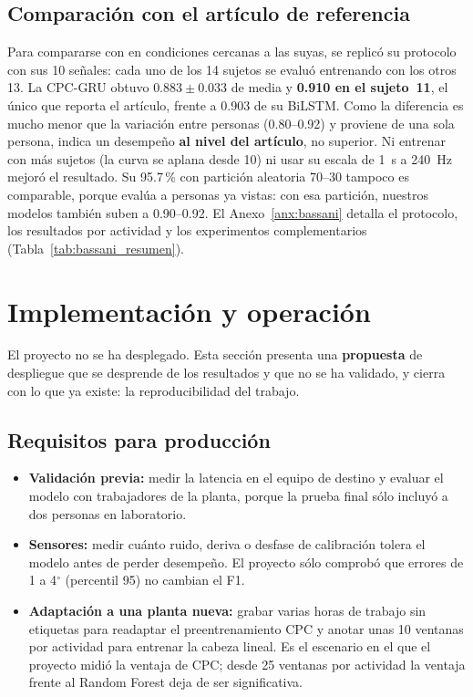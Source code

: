 \documentclass[letterpaper,11pt]{article}
\begin{document}
\subsection{Comparación con el artículo de referencia}
\label{sec:complementarias}
Para compararse con \textcite{bassani2025} en condiciones cercanas a las suyas, se replicó su protocolo con sus 10 señales: cada uno de los 14 sujetos se evaluó entrenando con los otros 13. La CPC-GRU obtuvo $0.883 \pm 0.033$ de media y \textbf{0.910 en el sujeto~11}, el único que reporta el artículo, frente a 0.903 de su BiLSTM. Como la diferencia es mucho menor que la variación entre personas (0.80--0.92) y proviene de una sola persona, indica un desempeño \textbf{al nivel del artículo}, no superior. Ni entrenar con más sujetos (la curva se aplana desde 10) ni usar su escala de 1~s a 240~Hz mejoró el resultado. Su 95.7\,\% con partición aleatoria 70--30 tampoco es comparable, porque evalúa a personas ya vistas: con esa partición, nuestros modelos también suben a 0.90--0.92. El Anexo~\ref{anx:bassani} detalla el protocolo, los resultados por actividad y los experimentos complementarios (Tabla~\ref{tab:bassani_resumen}).


\section{Implementación y operación}
El proyecto no se ha desplegado. Esta sección presenta una \textbf{propuesta} de despliegue que se desprende de los resultados y que no se ha validado, y cierra con lo que ya existe: la reproducibilidad del trabajo.

\subsection{Requisitos para producción}
\begin{itemize}
  \item \textbf{Validación previa:} medir la latencia en el equipo de destino y evaluar el modelo con trabajadores de la planta, porque la prueba final sólo incluyó a dos personas en laboratorio.
  \item \textbf{Sensores:} medir cuánto ruido, deriva o desfase de calibración tolera el modelo antes de perder desempeño. El proyecto sólo comprobó que errores de 1 a 4$^\circ$ (percentil 95) no cambian el F1.
  \item \textbf{Adaptación a una planta nueva:} grabar varias horas de trabajo sin etiquetas para readaptar el preentrenamiento CPC y anotar unas 10 ventanas por actividad para entrenar la cabeza lineal. Es el escenario en el que el proyecto midió la ventaja de CPC; desde 25 ventanas por actividad la ventaja frente al Random Forest deja de ser significativa.
\end{itemize}
\end{document}
